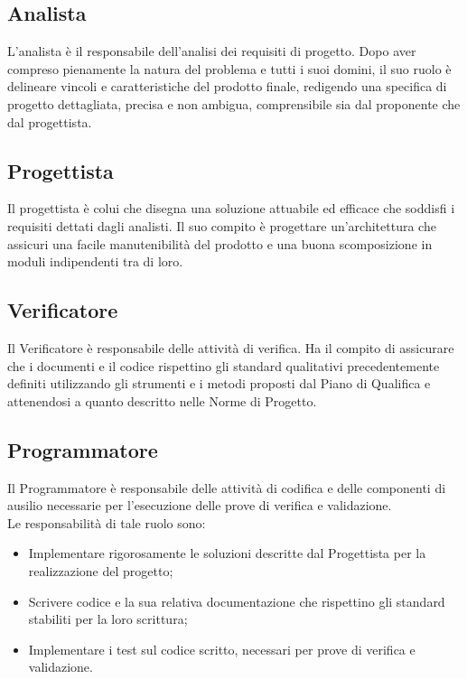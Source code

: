 \subsection{Analista}
\label{2.3}
L'analista è il responsabile dell'analisi dei requisiti di progetto. Dopo aver compreso pienamente la natura del problema e tutti i suoi domini, il suo ruolo è delineare vincoli e caratteristiche del prodotto finale, redigendo una specifica di progetto dettagliata, precisa e non ambigua, comprensibile sia dal proponente che dal progettista.

\subsection{Progettista}
\label{2.4}
Il progettista è colui che disegna una soluzione attuabile ed efficace che soddisfi i requisiti dettati dagli analisti. Il suo compito è progettare un'architettura che assicuri una facile manutenibilità del prodotto e una buona scomposizione in moduli indipendenti tra di loro.

\subsection{Verificatore}
\label{2.5}
Il Verificatore è responsabile delle attività di verifica. Ha il compito di assicurare che i  documenti e il codice rispettino gli standard qualitativi precedentemente definiti utilizzando gli strumenti e i metodi proposti dal Piano di Qualifica e attenendosi a quanto descritto nelle Norme di Progetto. 

\subsection{Programmatore}
\label{2.6}
Il Programmatore è responsabile delle attività di codifica e delle componenti di ausilio
necessarie per l'esecuzione delle prove di verifica e validazione.\\
Le responsabilità di  tale ruolo sono:
\begin{itemize}
\item Implementare rigorosamente le soluzioni descritte dal Progettista per la realizzazione del progetto;
\item Scrivere codice e la sua relativa documentazione che rispettino gli standard stabiliti per la loro scrittura;
\item Implementare i test sul codice scritto, necessari per prove di verifica e validazione.
\end{itemize}

